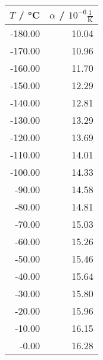 \begin{tabular}{rr}
\toprule
$T$ / °C & $\alpha$ / $10^{-6} \frac{1}{\text{K}}$ \\
\midrule
-180.00 & 10.04 \\
-170.00 & 10.96 \\
-160.00 & 11.70 \\
-150.00 & 12.29 \\
-140.00 & 12.81 \\
-130.00 & 13.29 \\
-120.00 & 13.69 \\
-110.00 & 14.01 \\
-100.00 & 14.33 \\
-90.00 & 14.58 \\
-80.00 & 14.81 \\
-70.00 & 15.03 \\
-60.00 & 15.26 \\
-50.00 & 15.46 \\
-40.00 & 15.64 \\
-30.00 & 15.80 \\
-20.00 & 15.96 \\
-10.00 & 16.15 \\
-0.00 & 16.28 \\
\bottomrule
\end{tabular}
